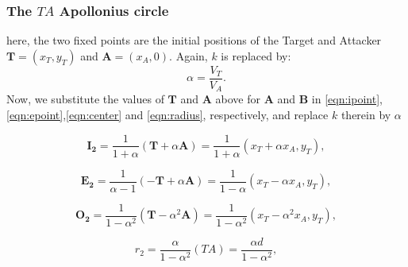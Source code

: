 \documentclass{beamer}
\begin{document}
\begin{frame}
\frametitle{The $TA$ Apollonius circle}
here, the two fixed points are the initial positions of the Target and Attacker $\boldsymbol{T}=(x_{T},y_{T})$ and $\boldsymbol{A}=(x_{A},0)$.
Again, $k$ is replaced by:
\begin{equation}
\alpha= \dfrac{V_{T}}{V_{A}}.
\end{equation}
Now, we substitute the values of $\boldsymbol{T}$ and $\boldsymbol{A}$ above for $\boldsymbol{A}$ and $\boldsymbol{B}$ in \eqref{eqn:ipoint},\eqref{eqn:epoint},\eqref{eqn:center} and \eqref{eqn:radius}, respectively, and replace $k$ therein by $\alpha$

\begin{equation}
\boldsymbol{I_{2}} =\dfrac{1}{1+\alpha}(\boldsymbol{T}+\alpha \boldsymbol{A}) =\dfrac{1}{1+\alpha}(x_{T}+\alpha x_{A},y_{T}),
\end{equation}

\begin{equation}
\boldsymbol{E_{2}} =\dfrac{1}{\alpha-1}(-\boldsymbol{T}+\alpha \boldsymbol{A}) =\dfrac{1}{1-\alpha}(x_{T}-\alpha x_{A},y_{T}),
\end{equation}

\begin{equation}
\boldsymbol{O_{2}} =\dfrac{1}{1-\alpha^{2}}(\boldsymbol{T}-\alpha^{2} \boldsymbol{A}) =\dfrac{1}{1-\alpha^{2}}(x_{T}-\alpha^{2} x_{A},y_{T}),
\label{O2}
\end{equation}

\begin{equation}
r_{2} =\dfrac{\alpha}{1-\alpha^{2}}(TA)
 = \dfrac{\alpha d}{1-\alpha^{2}},
 \label{r2}
\end{equation}
%
\end{frame}

\subsection{}
\end{document}
